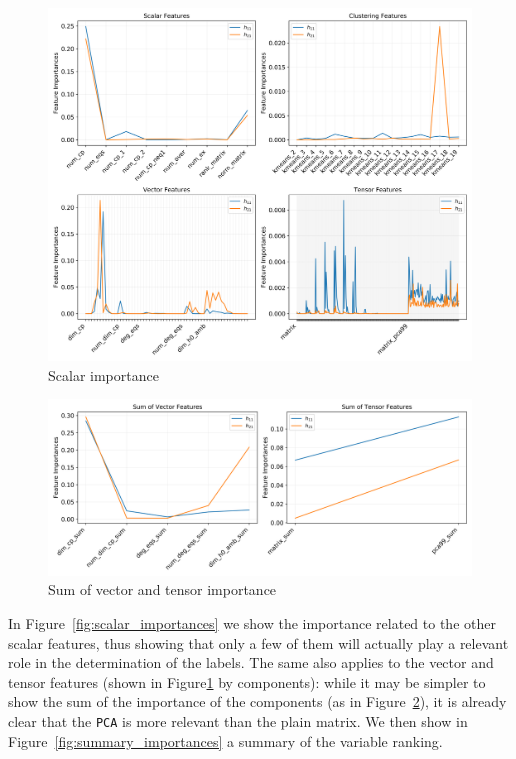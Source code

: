    \begin{figure}[!t]
        \centering
        \includegraphics[width=\textwidth,
                         trim={0 0 0 6in},
                         clip
                        ]{tex/img/feature_importances.png}
        \caption{Scalar importance}
        \label{fig:vector_tensor_importances}
    \end{figure}
    
    \begin{figure}[!t]
        \centering
        \includegraphics[width=\textwidth]{tex/img/feature_importances_vector_tensor_sum.png}
        \caption{Sum of vector and tensor importance}
        \label{fig:vector_tensor_sum_importances}
    \end{figure}
    
    In Figure~\ref{fig:scalar_importances} we show the importance related to the other scalar features, thus showing that only a few of them will actually play a relevant role in the determination of the labels. The same also applies to the vector and tensor features (shown in Figure\ref{fig:vector_tensor_importances} by components): while it may be simpler to show the sum of the importance of the components (as in Figure~\ref{fig:vector_tensor_sum_importances}), it is already clear that the \texttt{PCA} is more relevant than the plain matrix. We then show in Figure~\ref{fig:summary_importances} a summary of the variable ranking.
    

